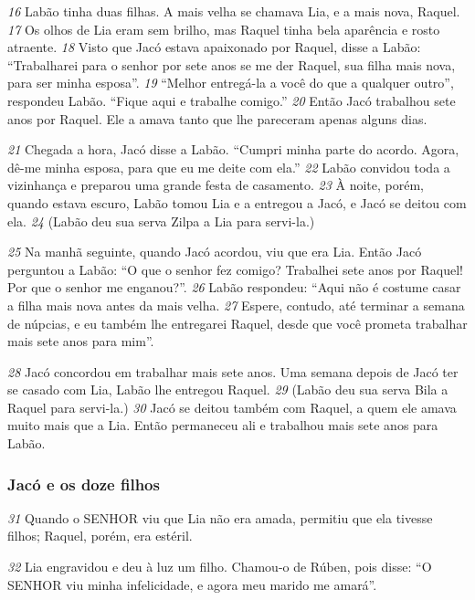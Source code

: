 \bigskip   
\textit{\tiny 16}
Labão tinha duas filhas. A mais velha se chamava Lia, e a mais nova, Raquel.
\textit{\tiny 17}
Os olhos de Lia eram sem brilho, mas Raquel tinha bela aparência e rosto
atraente. 
\textit{\tiny 18}
Visto que Jacó estava apaixonado por Raquel, disse a Labão:
“Trabalharei para o senhor por sete anos se me der Raquel, sua filha mais nova,
para ser minha esposa”.
\textit{\tiny 19}
“Melhor entregá-la a você do que a qualquer outro”, respondeu Labão. “Fique
aqui e trabalhe comigo.” 
\textit{\tiny 20}
Então Jacó trabalhou sete anos por Raquel. Ele a amava
tanto que lhe pareceram apenas alguns dias.

\bigskip   
\textit{\tiny 21}
Chegada a hora, Jacó disse a Labão. “Cumpri minha parte do acordo. Agora,
dê-me minha esposa, para que eu me deite com ela.”
\textit{\tiny 22}
Labão convidou toda a vizinhança e preparou uma grande festa de
casamento. 
\textit{\tiny 23}
À noite, porém, quando estava escuro, Labão tomou Lia e a entregou
a Jacó, e Jacó se deitou com ela. 
\textit{\tiny 24}
(Labão deu sua serva Zilpa a Lia para servi-la.)

\bigskip   
\textit{\tiny 25}
Na manhã seguinte, quando Jacó acordou, viu que era Lia. Então Jacó
perguntou a Labão: “O que o senhor fez comigo? Trabalhei sete anos por Raquel!
Por que o senhor me enganou?”.
\textit{\tiny 26}
Labão respondeu: “Aqui não é costume casar a filha mais nova antes da mais
velha. 
\textit{\tiny 27}
Espere, contudo, até terminar a semana de núpcias, e eu também lhe
entregarei Raquel, desde que você prometa trabalhar mais sete anos para mim”.

\bigskip   
\textit{\tiny 28}
Jacó concordou em trabalhar mais sete anos. Uma semana depois de Jacó ter
se casado com Lia, Labão lhe entregou Raquel. 
\textit{\tiny 29}
(Labão deu sua serva Bila a
Raquel para servi-la.) 
\textit{\tiny 30}
Jacó se deitou também com Raquel, a quem ele amava
muito mais que a Lia. Então permaneceu ali e trabalhou mais sete anos para
Labão.

\bigskip   
\subsubsection*{Jacó e os doze filhos}
\textit{\tiny 31}
Quando o SENHOR viu que Lia não era amada, permitiu que ela tivesse filhos;
Raquel, porém, era estéril. 

\bigskip   
\textit{\tiny 32}
Lia engravidou e deu à luz um filho. Chamou-o de
Rúben, pois disse: “O SENHOR viu minha infelicidade, e agora meu marido me
amará”.

